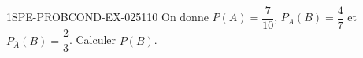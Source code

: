 \begin{exercice}{1SPE-PROBCOND-EX-025}{1}{10}
On donne $P(A) = \dfrac{7}{10}$, $P_A(B) = \dfrac{4}{7}$ et $P_{\overline{A}}(B) = \dfrac{2}{3}$. Calculer $P(B)$.
\end{exercice}
